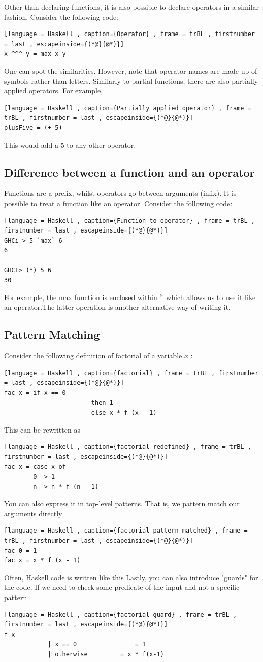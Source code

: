 \documentclass[a4paper]{article}
\theoremstyle{plain}
\theoremstyle{definition}
\theoremstyle{remark}
\begin{document}
Other than declaring functions, it is also possible to declare operators in a similar fashion. Consider the following code:
\begin{lstlisting}[language = Haskell , caption={Operator} , frame = trBL , firstnumber = last , escapeinside={(*@}{@*)}]
x ^^^ y = max x y
\end{lstlisting}
One can spot the similarities. However, note that operator names are made up of symbols rather than letters.
Similarly to partial functions, there are also partially applied operators. For example,
\begin{lstlisting}[language = Haskell , caption={Partially applied operator} , frame = trBL , firstnumber = last , escapeinside={(*@}{@*)}]
plusFive = (+ 5)
\end{lstlisting}
This would add a $5$ to any other operator.
\subsection{Difference between a function and an operator}
Functions are a prefix, whilst operators go between arguments (infix). It is possible to treat a function like an operator. Consider the following code:
\begin{lstlisting}[language = Haskell , caption={Function to operator} , frame = trBL , firstnumber = last , escapeinside={(*@}{@*)}]
GHCi > 5 `max` 6
6

GHCI> (*) 5 6
30
\end{lstlisting}
For example, the max function is enclosed within $``$ which allows us to use it like an operator.The latter operation is another alternative way of writing it.
\subsection{Pattern Matching}
Consider the following definition of factorial of a variable $x$ :
\begin{lstlisting}[language = Haskell , caption={factorial} , frame = trBL , firstnumber = last , escapeinside={(*@}{@*)}]
fac x = if x == 0 
						then 1
						else x * f (x - 1)
\end{lstlisting}
This can be rewritten as
\begin{lstlisting}[language = Haskell , caption={factorial redefined} , frame = trBL , firstnumber = last , escapeinside={(*@}{@*)}]
fac x = case x of
		0 -> 1
		n -> n * f (n - 1)
\end{lstlisting}	
You can also express it in top-level patterns. That is, we pattern match our arguments directly
\begin{lstlisting}[language = Haskell , caption={factorial pattern matched} , frame = trBL , firstnumber = last , escapeinside={(*@}{@*)}]
fac 0 = 1
fac x = x * f (x - 1)
\end{lstlisting}
Often, Haskell code is written like this
Lastly, you can also introduce "guards" for the code. If we need to check some predicate of the input and not a specific pattern
\begin{lstlisting}[language = Haskell , caption={factorial guard} , frame = trBL , firstnumber = last , escapeinside={(*@}{@*)}]
f x
			| x == 0 				= 1
			| otherwise 		= x * f(x-1)
\end{lstlisting}
\end{document}
